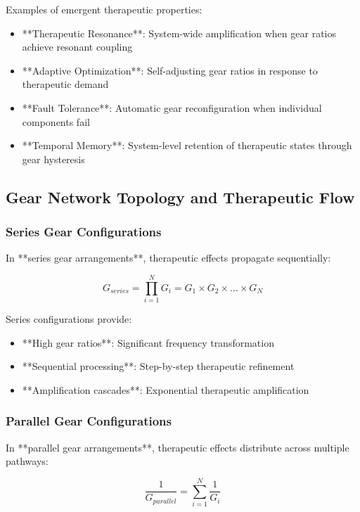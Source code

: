 \documentclass[12pt,a4paper]{article}
\begin{document}
Examples of emergent therapeutic properties:

\begin{itemize}
\item **Therapeutic Resonance**: System-wide amplification when gear ratios achieve resonant coupling
\item **Adaptive Optimization**: Self-adjusting gear ratios in response to therapeutic demand
\item **Fault Tolerance**: Automatic gear reconfiguration when individual components fail
\item **Temporal Memory**: System-level retention of therapeutic states through gear hysteresis
\end{itemize}

\subsection{Gear Network Topology and Therapeutic Flow}

\subsubsection{Series Gear Configurations}

In **series gear arrangements**, therapeutic effects propagate sequentially:

\begin{equation}
G_{series} = \prod_{i=1}^{N} G_i = G_1 \times G_2 \times ... \times G_N
\end{equation}

Series configurations provide:
\begin{itemize}
\item **High gear ratios**: Significant frequency transformation
\item **Sequential processing**: Step-by-step therapeutic refinement
\item **Amplification cascades**: Exponential therapeutic amplification
\end{itemize}

\subsubsection{Parallel Gear Configurations}

In **parallel gear arrangements**, therapeutic effects distribute across multiple pathways:

\begin{equation}
\frac{1}{G_{parallel}} = \sum_{i=1}^{N} \frac{1}{G_i}
\end{equation}
\end{document}
